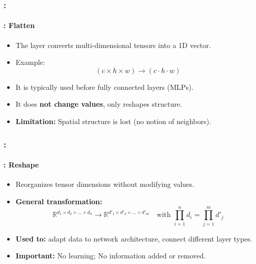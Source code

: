\documentclass[xcolor=table]{beamer}
\begin{document}
\begin{frame}
	\frametitle{\insertshortsubtitle: \insertsection}
	\framesubtitle{\insertsubsection: Flatten}
	
	\begin{itemize}
		
		\item The  layer converts multi-dimensional tensors into a 1D vector.
		
		\item Example:
		\[
		(c \times h \times w) \rightarrow (c \cdot h \cdot w)
		\]
		
		\item It is typically used before fully connected layers (MLPs).
		
		\item It does \textbf{not change values}, only reshapes structure.
		
		\item \textbf{Limitation:} Spatial structure is lost (no notion of neighbors).
		
	\end{itemize}
	
	
\end{frame}

\begin{frame}
	\frametitle{\insertshortsubtitle: \insertsection}
	\framesubtitle{\insertsubsection: Reshape}
	
	\begin{itemize}
		
		\item Reorganizes tensor dimensions without modifying values.
		
		\item \textbf{General transformation:}
		\[
		\mathbb{R}^{d_1 \times d_2 \times \dots \times d_n}
		\rightarrow
		\mathbb{R}^{d'_1 \times d'_2 \times \dots \times d'_m}
		\quad \text{with } \prod_{i=1}^{n} d_i = \prod_{j=1}^{m} d'_j
		\]
		
		\item \textbf{Used to:} adapt data to network architecture, connect different layer types.
		
		\item \textbf{Important:} No learning; No information added or removed.
		
	\end{itemize}
	
	\begin{center}
	\end{center}
	
\end{frame}
\end{document}
